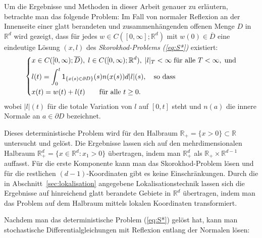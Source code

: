 \documentclass[10pt, a4paper, leqno, twoside, bibliography=totocnumbered, final]{scrartcl}
\theoremstyle{definition}
\theoremstyle{plain}%
\theoremstyle{remark}
\begin{document}
Um die Ergebnisse und Methoden in dieser Arbeit genauer zu erläutern, betrachte man das folgende Problem: Im Fall von normaler Reflexion an der Innenseite einer glatt berandeten und zusammenhängenden offenen Menge $D$ in $ \mathbb{R}^d $ wird gezeigt, dass für jedes $ w \in C([0, \infty]; \mathbb{R}^d) $ mit $ w(0) \in \overline{D} $ eine eindeutige Lösung $ (x,l) $ des \emph{Skorokhod-Problems (\ref{eq:S*})} existiert:
\begin{equation}
\label{eq:S*}
\left \{ \begin{aligned}
& x \in C([0, \infty); \overline{D}), \; l \in C([0, \infty); \mathbb{R}^d), \; |l|_T < \infty \; \text{für alle } T < \infty, \; \text{und} \\  
& l(t) = \int_0^t \mathsf{1}_{\{ x(s) \in \partial D \} }(s) n(x(s)) d|l|(s), \quad \text{so dass} \\
& x(t) = w(t) + l(t) \qquad \text{für alle $ t \geq 0 $}.
\end{aligned} \right .
\end{equation}
wobei $|l|(t)$ für die totale Variation von $l$ auf $ [0,t] $ steht und $n(a)$ die innere Normale an $ a \in \partial D $ bezeichnet.

Dieses deterministische Problem wird für den Halbraum $ \mathbb{R}_+ = \{x > 0 \} \subset \mathbb{R} $ untersucht und gelöst. Die Ergebnisse lassen sich auf den mehrdimensionalen Halbraum $ \mathbb{R}_+^d = \{ x \in \mathbb{R}^d : x_1 > 0 \} $ übertragen, indem man $ \mathbb{R}_+^d $ als $ \mathbb{R}_+ \times \mathbb{R}^{d-1} $ auffasst. Für die erste Komponente kann man das Skorokhod-Problem lösen und für die restlichen $(d-1)$-Koordinaten gibt es keine Einschränkungen. Durch die in Abschnitt~\ref{sec:lokalisation} angegebene Lokalisationstechnik lassen sich die Ergebnisse auf hinreichend glatt berandete Gebiete in $ \mathbb{R}^d $ übertragen, indem man das Problem auf dem Halbraum mittels lokalen Koordinaten transformiert.\newline

Nachdem man das deterministische Problem (\ref{eq:S*}) gelöst hat, kann man stochastische Differentialgleichungen mit Reflexion entlang der Normalen lösen:
\end{document}
